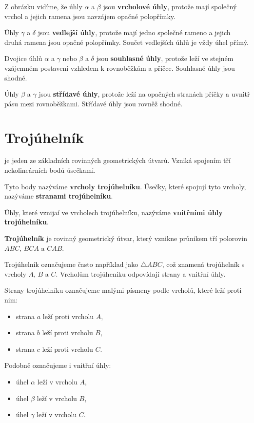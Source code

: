 \documentclass[12pt,a4paper]{article}
\begin{document}
Z obrázku vidíme, že úhly \(\alpha\) a \(\beta\) jsou \textbf{vrcholové úhly},
protože mají společný vrchol a jejich ramena jsou navzájem opačné polopřímky.

Úhly \(\gamma\) a \(\delta\) jsou \textbf{vedlejší úhly},
protože mají jedno společné rameno a jejich druhá ramena jsou opačné polopřímky.
Součet vedlejších úhlů je vždy úhel přímý.

Dvojice úhlů \(\alpha\) a \(\gamma\) nebo \(\beta\) a \(\delta\) jsou \textbf{souhlasné úhly},
protože leží ve stejném vzájemném postavení vzhledem k rovnoběžkám a příčce.
Souhlasné úhly jsou shodné.

Úhly \(\beta\) a \(\gamma\) jsou \textbf{střídavé úhly},
protože leží na opačných stranách příčky a uvnitř pásu mezi rovnoběžkami.
Střídavé úhly jsou rovněž shodné.


\section{Trojúhelník}

 je jeden ze základních rovinných geometrických útvarů.
Vzniká spojením tří nekolineárních bodů úsečkami.

Tyto body nazýváme \textbf{vrcholy trojúhelníku}.
Úsečky, které spojují tyto vrcholy, nazýváme \textbf{stranami trojúhelníku}.

Úhly, které vznijaí ve vrcholech trojúhelníku, nazýváme \textbf{vnitřními úhly trojúhelníku}.

\begin{definitionbox}
    \textbf{Trojúhelník} je rovinný geometrický útvar, který vznikne průnikem tří polorovin $ABC$, $BCA$ a $CAB$.
\end{definitionbox}

Trojúhelník označujeme často například jako \(\triangle ABC\), což znamená trojúhelník s vrcholy \(A\), \(B\) a \(C\).
Vrcholům trojúheníku odpovídají strany a vnitřní úhly.

Strany trojúhelníku označujeme malými písmeny podle vrcholů, které leží proti nim:
\begin{itemize}
    \item strana \(a\) leží proti vrcholu \(A\),
    \item strana \(b\) leží proti vrcholu \(B\),
    \item strana \(c\) leží proti vrcholu \(C\).
\end{itemize}

Podobně označujeme i vnitřní úhly:
\begin{itemize}
    \item úhel \(\alpha\) leží v vrcholu \(A\),
    \item úhel \(\beta\) leží v vrcholu \(B\),
    \item úhel \(\gamma\) leží v vrcholu \(C\).
\end{itemize}
\end{document}
